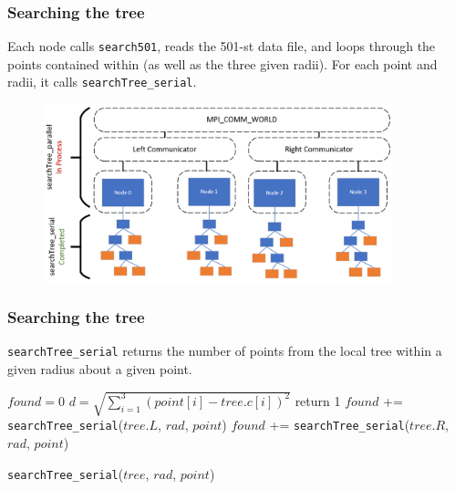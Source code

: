 \documentclass[usernames,dvipsnames]{beamer}
\begin{document}
\begin{frame}
	\frametitle{Searching the tree}
	
	Each node calls \texttt{search501}, reads the 501-st data file, and loops through the points contained within (as well as the three given radii). For each point and radii, it calls \texttt{searchTree\_serial}.
	

\begin{figure}
    \centering
    \includegraphics[width=0.9\textwidth]{images/searchTree.png}
\end{figure}	

		
\end{frame}


\begin{frame}
	\frametitle{Searching the tree}
	
	\texttt{searchTree\_serial} returns the number of points from the local tree within a given radius about a given point.
	
	\vspace{10pt}
	
	\begin{algorithm}[H]
		\footnotesize
		\begin{algorithmic}[1]
			\STATE $found = 0$
			\STATE $d = \sqrt{ \sum_{i=1}^{3} (point[i] - tree.c[i])^2}$
					\STATE return 1
				\ELSE
						\STATE $found$ += \texttt{searchTree\_serial}($tree.L$, $rad$, $point$)
					\ENDIF
						\STATE $found$ += \texttt{searchTree\_serial}($tree.R$, $rad$, $point$)
					\ENDIF
				\ENDIF
			\ENDIF
		\end{algorithmic}
		\caption{\texttt{searchTree\_serial}($tree$, $rad$, $point$)}
	\end{algorithm}
		
\end{frame}
\end{document}
